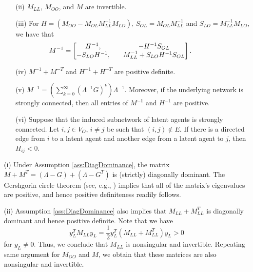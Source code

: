\documentclass[opre,nonblindrev]{informs3} %
\begin{document}
\begin{APPENDIX}{}
\begin{lemma}
\begin{itemize}
		\item[(ii)] 	$M_{LL}$, $M_{OO}$, and $M$ are invertible.
		
		\item[(iii)] 	 For $H= (M_{OO}-M_{OL}M_{LL}^{-1}M_{LO})$, $S_{OL}=M_{OL}M^{-1}_{LL}$ and $S_{LO}=M_{LL}^{-1}M_{LO}$, we have that
		\begin{equation}
		\hspace{-.5in}
		M^{-1}=
		\begin{bmatrix}
		H^{-1}, & \quad  -H^{-1}S_{OL} \\
		-S_{LO} 	H^{-1}, &\quad
		M_{LL}^{-1}+ S_{LO} 	H^{-1} S_{OL}
		\end{bmatrix}.
		\end{equation}
		\item[(iv)] $M^{-1}+M^{-T}$ and $H^{-1}+H^{-T}$ are positive definite.
		
		\item[(v)] $M^{-1} = \left(
		\sum_{k=0}^\infty (\Lambda^{-1 }G)^k \right) \Lambda^{-1}$. Moreover, if the underlying network is strongly connected, then all entries of
		$M^{-1}$ and $H^{-1}$
		are positive.
		
		\item[(vi)] Suppose that the induced subnetwork of latent agents is strongly connected.
		Let  $i,j\in V_O$, $i\neq j$ be such that $(i,j)\notin E$.
		If there is a directed edge from $i$ to a latent agent and another edge from a latent agent to $j$, then
		$H_{ij}<0$.
	\end{itemize}
	
\end{lemma}

(i) Under Assumption \ref{ass:DiagDominance}, the matrix
$M+M^T= (\Lambda - G )+(\Lambda -G^T) $ is (strictly) diagonally dominant. The
Gershgorin circle theorem (see, e.g., \cite{horn2012matrix}) implies that
all of the matrix's eigenvalues are positive, and hence positive definiteness readily follows.

(ii)  Assumption \ref{ass:DiagDominance} also implies that   $M_{LL}+M_{LL}^T$ is  diagonally dominant and hence positive definite.
Note that we have
$$
{y}_L^T M_{LL} {y}_L= \frac{1}{2} {y}_L^T (M_{LL}+M_{LL}^T) {y}_L>0
$$
for ${y}_L\neq 0$. Thus, we conclude  that $M_{LL}$ is nonsingular and invertible. Repeating same argument for $M_{OO}$ and $M$, we obtain that these matrices are also nonsingular and invertible.


\end{APPENDIX}
\end{document}
